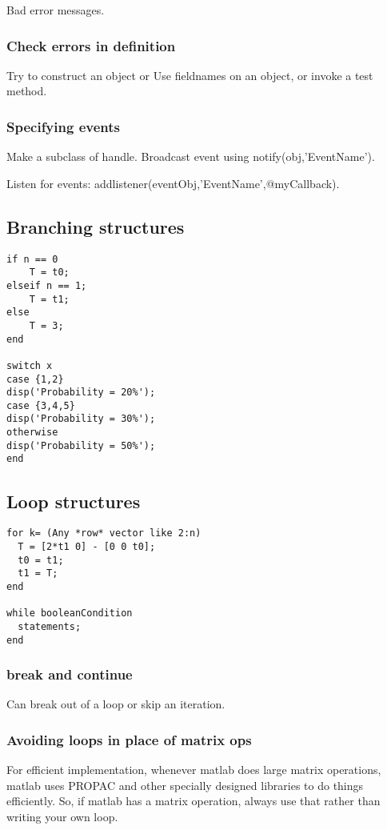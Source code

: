 Bad error messages.

\subsubsection{Check errors in definition}
Try to construct an object or Use fieldnames on an object, or invoke a test method.

\subsubsection{Specifying events}
Make a subclass of handle. Broadcast event using notify(obj,'EventName').

Listen for events: addlistener(eventObj,'EventName',@myCallback).

\subsection{Branching structures}
\begin{verbatim}
if n == 0
    T = t0;
elseif n == 1;
    T = t1;
else
    T = 3;
end

switch x
case {1,2}
disp('Probability = 20%');
case {3,4,5}
disp('Probability = 30%');
otherwise
disp('Probability = 50%');
end
\end{verbatim}

\subsection{Loop structures}
\begin{verbatim}
for k= (Any *row* vector like 2:n)
  T = [2*t1 0] - [0 0 t0];
  t0 = t1;
  t1 = T;
end

while booleanCondition
  statements;
end
\end{verbatim}

\subsubsection{break and continue}
Can break out of a loop or skip an iteration.

\subsubsection{Avoiding loops in place of matrix ops}
For efficient implementation, whenever matlab does large matrix operations, matlab uses PROPAC and other specially designed libraries to do things efficiently. So, if matlab has a matrix operation, always use that rather than writing your own loop.

